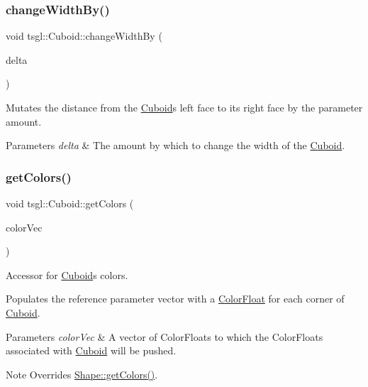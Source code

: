 \subsubsection{\texorpdfstring{change\+Width\+By()}{changeWidthBy()}}
{\footnotesize\ttfamily void tsgl\+::\+Cuboid\+::change\+Width\+By (\begin{DoxyParamCaption}\item[{G\+Lfloat}]{delta }\end{DoxyParamCaption})\hspace{0.3cm}{\ttfamily [virtual]}}



Mutates the distance from the \hyperlink{classtsgl_1_1_cuboid}{Cuboid}\textquotesingle{}s left face to its right face by the parameter amount. 


\begin{DoxyParams}{Parameters}
{\em delta} & The amount by which to change the width of the \hyperlink{classtsgl_1_1_cuboid}{Cuboid}. \\
\hline
\end{DoxyParams}
\mbox{\label{classtsgl_1_1_cuboid_ac3e7d161cb2dbb02cf000e92d84e10ba}} 
\subsubsection{\texorpdfstring{get\+Colors()}{getColors()}}
{\footnotesize\ttfamily void tsgl\+::\+Cuboid\+::get\+Colors (\begin{DoxyParamCaption}\item[{std\+::vector$<$ \hyperlink{structtsgl_1_1_color_float}{Color\+Float} $>$ \&}]{color\+Vec }\end{DoxyParamCaption})\hspace{0.3cm}{\ttfamily [virtual]}}



Accessor for \hyperlink{classtsgl_1_1_cuboid}{Cuboid}\textquotesingle{}s colors. 

Populates the reference parameter vector with a \hyperlink{structtsgl_1_1_color_float}{Color\+Float} for each corner of \hyperlink{classtsgl_1_1_cuboid}{Cuboid}. 
\begin{DoxyParams}{Parameters}
{\em color\+Vec} & A vector of Color\+Floats to which the Color\+Floats associated with \hyperlink{classtsgl_1_1_cuboid}{Cuboid} will be pushed. \\
\hline
\end{DoxyParams}
\begin{DoxyNote}{Note}
Overrides \hyperlink{classtsgl_1_1_shape_a6f54fe4d049f69a287edf8335a9509f8}{Shape\+::get\+Colors()}. 
\end{DoxyNote}


